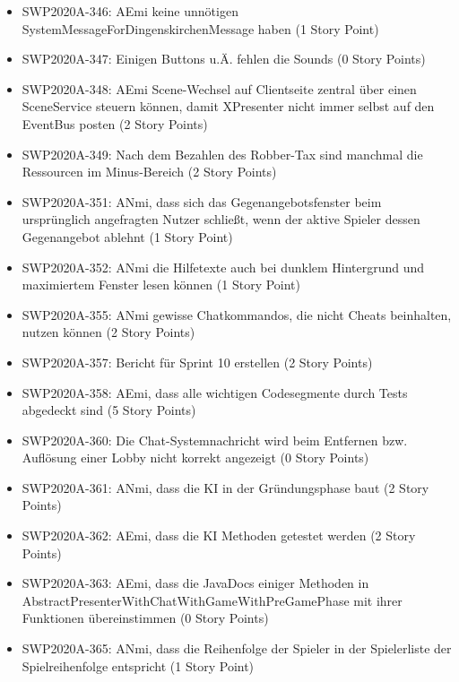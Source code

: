 \documentclass[12pt,a4paper, oneside]{article}
\begin{document}
\begin{itemize}
\item SWP2020A-346: AEmi keine unnötigen SystemMessageForDingenskirchenMessage haben (1 Story Point)

\item SWP2020A-347: Einigen Buttons u.Ä. fehlen die Sounds (0 Story Points)

\item SWP2020A-348:	AEmi Scene-Wechsel auf Clientseite zentral über einen SceneService steuern können, damit XPresenter nicht immer selbst auf den EventBus posten (2 Story Points)

\item SWP2020A-349:	Nach dem Bezahlen des Robber-Tax sind manchmal die Ressourcen im Minus-Bereich (2 Story Points)

\item SWP2020A-351: ANmi, dass sich das Gegenangebotsfenster beim ursprünglich angefragten Nutzer schließt, wenn der aktive Spieler dessen Gegenangebot ablehnt (1 Story Point)

\item SWP2020A-352:	ANmi die Hilfetexte auch bei dunklem Hintergrund und maximiertem Fenster lesen können (1 Story Point)

\item SWP2020A-355:	ANmi gewisse Chatkommandos, die nicht Cheats beinhalten, nutzen können (2 Story Points)

\item SWP2020A-357:	Bericht für Sprint 10 erstellen (2 Story Points)

\item SWP2020A-358:	AEmi, dass alle wichtigen Codesegmente durch Tests abgedeckt sind (5 Story Points)

\item SWP2020A-360:	Die Chat-Systemnachricht wird beim Entfernen bzw. Auflösung einer Lobby nicht korrekt angezeigt (0 Story Points)

\item SWP2020A-361: ANmi, dass die KI in der Gründungsphase baut (2 Story Points)

\item SWP2020A-362:	AEmi, dass die KI Methoden getestet werden (2 Story Points)

\item SWP2020A-363:	AEmi, dass die JavaDocs einiger Methoden in AbstractPresenterWithChatWithGameWithPreGamePhase mit ihrer Funktionen übereinstimmen (0 Story Points)

\item SWP2020A-365: ANmi, dass die Reihenfolge der Spieler in der Spielerliste der Spielreihenfolge entspricht (1 Story Point)


\end{itemize}
\end{document}
